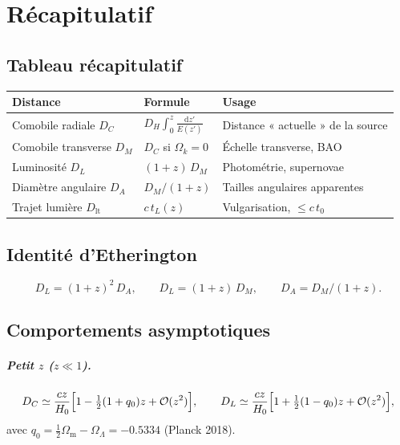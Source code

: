\documentclass[11pt,a4paper,openany]{report}
\newcommand{\dif}{\mathrm{d}}
\newcommand{\Hzero}{H_{0}}
\newcommand{\Om}{\Omega_{\mathrm{m}}}
\newcommand{\OL}{\Omega_{\Lambda}}
\newcommand{\Ok}{\Omega_{k}}
\begin{document}
\chapter{Récapitulatif}

\section{Tableau récapitulatif}

\begin{center}
\renewcommand{\arraystretch}{1.5}
\begin{tabular}{p{4.2cm}p{4.8cm}p{6cm}}
\toprule
\textbf{Distance} & \textbf{Formule} & \textbf{Usage} \\
\midrule
Comobile radiale $D_{C}$
 & $\displaystyle D_{H}\int_{0}^{z}\frac{\dif z'}{E(z')}$
 & Distance « actuelle » de la source \\
Comobile transverse $D_{M}$
 & $D_{C}$ si $\Ok=0$
 & Échelle transverse, BAO \\
Luminosité $D_{L}$
 & $(1+z)\,D_{M}$
 & Photométrie, supernovae \\
Diamètre angulaire $D_{A}$
 & $D_{M}/(1+z)$
 & Tailles angulaires apparentes \\
Trajet lumière $D_{\text{lt}}$
 & $c\,t_{L}(z)$
 & Vulgarisation, $\le c\,t_{0}$ \\
\bottomrule
\end{tabular}
\end{center}

\section{Identité d'Etherington}
\[
D_{L} = (1+z)^{2}\,D_{A}, \qquad D_{L} = (1+z)\,D_{M}, \qquad D_{A} = D_{M}/(1+z).
\]

\section{Comportements asymptotiques}

\paragraph{Petit $z$ ($z\ll 1$).}
\[
D_{C} \simeq \frac{cz}{\Hzero}\Bigl[1 - \tfrac{1}{2}(1+q_{0})z + \mathcal{O}(z^{2})\Bigr],
\qquad
D_{L} \simeq \frac{cz}{\Hzero}\Bigl[1 + \tfrac{1}{2}(1-q_{0})z + \mathcal{O}(z^{2})\Bigr],
\]
avec $q_{0} = \tfrac{1}{2}\Om - \OL = -\num{0.5334}$ (Planck 2018).
\end{document}
